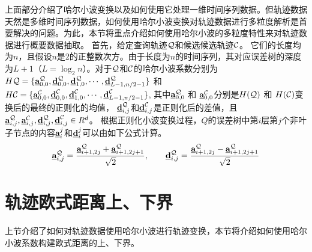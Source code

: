  上面部分介绍了哈尔小波变换以及如何使用它处理一维时间序列数据。但轨迹数据天然是多维时间序列数据，如何使用哈尔小波变换对轨迹数据进行多粒度解析是首要解决的问题。为此，本节将重点介绍如何使用哈尔小波的多粒度特性来对轨迹数据进行概要数据抽取。
 首先，给定查询轨迹$\cal Q$和候选候选轨迹$\cal C$。
 它们的长度均为$n$，且假设$n$是2的正整数次方。由于长度为$n$的时间序列，其对应误差树的深度为$L+1$（$L=\log_{2}n$）。对于$\cal Q$和$\cal C$的哈尔小波系数分别为$H{\cal Q}=\{\emph{{\textbf{a}}}_{0,0}^{\cal Q},\emph{{\textbf{d}}}_{0,0}^{\cal Q}, \emph{{\textbf{d}}}_{1,0}^{\cal Q},\cdots,\emph{{\textbf{d}}}_{L-1,n/2-1}^{\cal Q}\}$ 和 $H{\cal C}=\{\emph{{\textbf{a}}}_{0,0}^{\cal C},\emph{{\textbf{d}}}_{0,0}^{\cal C},\emph{{\textbf{d}}}_{1,0}^{\cal C},\cdots,\emph{{\textbf{d}}}_{L-1,n/2-1}^{\cal C}\}$, 
 其中$\emph{{\textbf{a}}}_{0,0}^{\cal Q}$ 和 $\emph{{\textbf{a}}}_{0,0}^{\cal C}$分别是$H({\cal Q})$ 和 $H({\cal C})$变换后的最终的正则化的均值， $\emph{{\textbf{d}}}_{i,j}^{\cal Q}$和$\emph{{\textbf{d}}}_{i,j}^{\cal C}$是正则化后的差值，且$\emph{{\textbf{a}}}_{i,j}^{\cal Q}, \emph{{\textbf{a}}}_{i,j}^{\cal C}, \emph{{\textbf{d}}}_{i,j}^{\cal Q}, \emph{{\textbf{d}}}_{i,j}^{\cal C} \in R^d$。
 根据正则化小波变换过程，$Q$的误差树中第$i$层第$j$个非叶子节点的内容$\emph{{\textbf{a}}}_{i}^{j}$和$\emph{{\textbf{d}}}_{i}^{j}$可以由如下公式计算。
 \begin{eqnarray}
\emph{{\textbf{a}}}_{i,j}^{\cal Q}=\frac{\emph{{\textbf{a}}}_{i+1,2j}^{\cal Q} + \emph{{\textbf{a}}}_{i+1,2j+1}^{\cal Q} }{\sqrt{2}},\qquad \emph{{\textbf{d}}}_{i,j}^{\cal Q}=\frac{\emph{{\textbf{a}}}_{i+1,2j}^{\cal Q} - \emph{{\textbf{a}}}_{i+1,2j+1}^{\cal Q} }{\sqrt{2}}
 \end{eqnarray}
 
 \section{轨迹欧式距离上、下界}\label{sec-c4-Bound}
上节介绍了如何对轨迹数据使用哈尔小波进行轨迹变换，本节将介绍如何使用哈尔小波系数构建欧式距离的上、下界。
